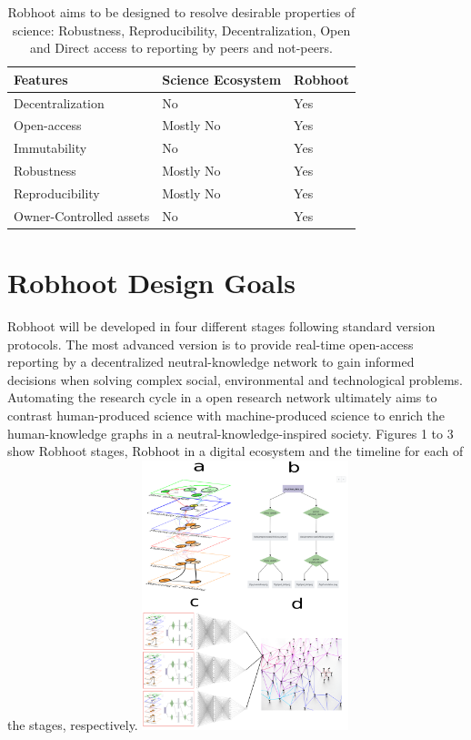 \documentclass[10pt, a4paper, twocolumn]{article} %
\begin{document}
{\begin{table}
\begin{tabular}{ p{3cm} | p{2cm} | p{2cm}}
  \hline \hline
  \textbf{Features} & \textbf{Science Ecosystem} &\textbf{Robhoot}\\  \hline
  Decentralization & No & Yes \\ \hline
  Open-access & Mostly No & Yes \\ \hline
  Immutability & No & Yes \\ \hline
  Robustness & Mostly No & Yes \\ \hline
  Reproducibility & Mostly No & Yes \\ \hline        
  Owner-Controlled assets & No & Yes \\ \hline       
  \bottomrule

\end{tabular}
\caption{Robhoot aims to be designed to resolve desirable properties
  of science: Robustness, Reproducibility, Decentralization, Open and
  Direct access to reporting by peers and not-peers.}
\end{table}
  \section{Robhoot Design Goals}
  Robhoot will be developed in four different stages following
  standard version protocols. The most advanced version is to provide
  real-time open-access reporting by a decentralized neutral-knowledge
  network to gain informed decisions when solving complex social,
  environmental and technological problems. Automating the research
  cycle in a open research network ultimately aims to contrast
  human-produced science with machine-produced science to enrich the
  human-knowledge graphs in a neutral-knowledge-inspired
  society. Figures 1 to 3 show Robhoot stages, Robhoot in a digital
  ecosystem and the timeline for each of the stages, respectively.
  \includegraphics[width=0.45\textwidth]{Figure1.pdf}

}
\end{document}

